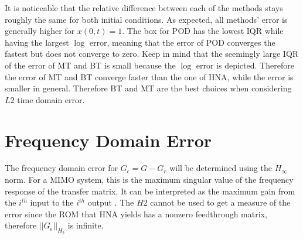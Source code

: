 It is noticeable that the relative difference between each of the methods stays roughly the same for both initial conditions.
As expected, all methods' error is generally higher for \(x(0, t) = 1\).
The box for POD has the lowest IQR while having the largest \(\log\) error, meaning that the error of POD converges the fastest but does not converge to zero.
Keep in mind that the seemingly large IQR of the error of MT and BT is small because the \(\log\) error is depicted.
Therefore the error of MT and BT converge faster than the one of HNA, while the error is smaller in general.
Therefore BT and MT are the best choices when considering \(L2\) time domain error.



\section{Frequency Domain Error}
The frequency domain error for \(G_{\epsilon }= G - G_r\) will be determined using the \(H_{\infty}\) norm.
For a MIMO system, this is the maximum singular value of the frequency response of the transfer matrix.
It can be interpreted as the maximum gain from the \(i^{th}\) input to the \(i^{th}\) output \cite{eugenio}.
The \(H2\) cannot be used to get a measure of the error since the ROM that HNA yields has a nonzero feedthrough matrix, therefore \(||G_{\epsilon}||_{H_{2}}\) is infinite. 

